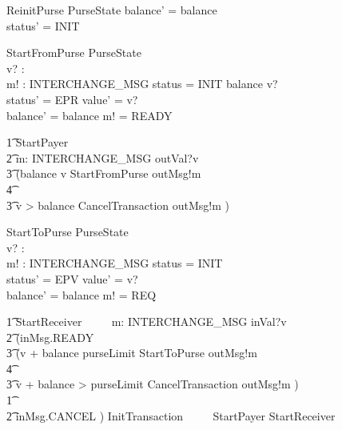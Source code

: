 \documentclass{article}
\begin{document}
\begin{schema}{ReinitPurse}
     \Delta PurseState
\where
      balance' = balance \\
      status' = INIT
\end{schema}

\begin{schema}{StartFromPurse}
     \Delta PurseState \\
     v? : \nat \\
     m! : INTERCHANGE\_MSG
\where
      status = INIT \land balance \geq v? \\
      status' = EPR \land value' = v? \\
      balance' = balance \land m! = READY       
\end{schema}

\begin{circusaction}
    \t1 StartPayer ~~\circdef~~ \\ 
    		\t2 \circvar m: INTERCHANGE\_MSG \circspot outVal?v \then \\
			\t3 (\lcircguard balance \geq v \rcircguard \circguard \lschexpract StartFromPurse \rschexpract \circseq outMsg!m \then \Skip \\
				\t4 \extchoice \\
			\t3 \lcircguard v > balance \rcircguard \circguard \lschexpract CancelTransaction \rschexpract \circseq outMsg!m \then \Skip)
\end{circusaction}

\begin{schema}{StartToPurse}
     \Delta PurseState \\
     v? : \nat \\
     m! : INTERCHANGE\_MSG
\where
      status = INIT\\
      status' = EPV \land value' = v? \\
      balance' = balance \land m! = REQ       
\end{schema}

\begin{circusaction}
    \t1 StartReceiver ~~\circdef~~  \circvar m: INTERCHANGE\_MSG \circspot inVal?v \then \\
		\t2 (inMsg.READY \then \\
			\t3 (\lcircguard v + balance \leq purseLimit \rcircguard \circguard \lschexpract StartToPurse \rschexpract \circseq outMsg!m \then \Skip \\
				\t4 \extchoice \\
			\t3 \lcircguard v + balance > purseLimit \rcircguard \circguard \lschexpract CancelTransaction \rschexpract \circseq outMsg!m \then \Skip) \\
		\t1 \extchoice \\
		\t2 inMsg.CANCEL \then \Skip) 
	\also
	InitTransaction ~~\circdef~~ StartPayer \extchoice StartReceiver
\end{circusaction}
\end{document}
